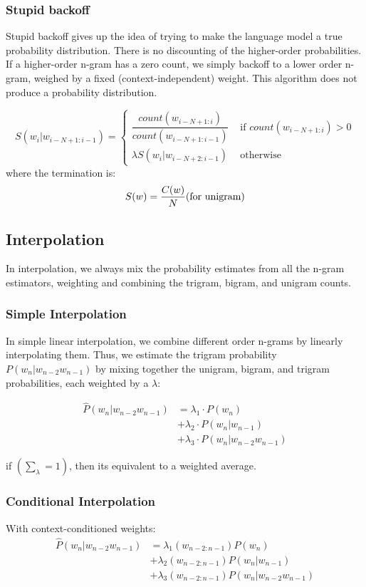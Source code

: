 \subsubsection{Stupid backoff}
Stupid backoff gives up the idea of trying to make the language model a true probability distribution. There is no discounting of the higher-order probabilities. If a higher-order n-gram has a zero count, we simply backoff to a lower order n-gram, weighed by a fixed (context-independent) weight. This algorithm does not produce a probability distribution.

\[
    S(w_i|w_{i-N+1:i-1}) = \begin{cases}
        \dfrac{count(w_{i-N+1:i})}{count(w_{i-N+1:i-1})} & \text{ if $count(w_{i-N+1:i}) > 0$}\\[0.2cm]
        \lambda S(w_i|w_{i-N+2:i-1}) & \text{ otherwise}
    \end{cases}
\]
where the termination is:
\[
    S(w) = \dfrac{C(w)}{N} \hfill \text{(for unigram)}
\]

\subsection{Interpolation}
In interpolation, we always mix the probability estimates from all the n-gram estimators, weighting and combining the trigram, bigram, and unigram counts.

\subsubsection{Simple Interpolation}
In simple linear interpolation, we combine different order n-grams by linearly interpolating them. Thus, we estimate the trigram probability $P(w_n|w_{n-2}w_{n-1})$ by mixing together the unigram, bigram, and trigram probabilities, each weighted by a $\lambda$:

\begin{align*}
    \hat{P}(w_n|w_{n-2}w_{n-1}) &= \lambda_1 \cdot P(w_n)  \\ 
    &+ \lambda_2 \cdot P(w_n|w_{n-1}) \\ 
    &+ \lambda_3 \cdot P(w_n|w_{n-2}w_{n-1}) 
\end{align*}


if \( \left( \sum_\lambda = 1 \right)\), then its equivalent to a weighted average.

\subsubsection{Conditional Interpolation}
With context-conditioned weights:
\begin{align*}
    \hat{P}(w_n|w_{n-2}w_{n-1}) &= \lambda_1(w_{n-2:n-1})P(w_n) \\ 
    &+ \lambda_2(w_{n-2:n-1})P(w_n|w_{n-1}) \\ 
    &+ \lambda_3(w_{n-2:n-1})P(w_n|w_{n-2}w_{n-1}) \\ 
\end{align*}

